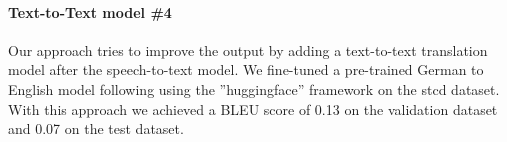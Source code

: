 \paragraph{Text-to-Text model \#4} Our  approach tries to improve the output by adding a text-to-text translation model after the speech-to-text model. We fine-tuned a pre-trained German to
English model following  using the ''huggingface'' framework \cite{wolf-etal-2020-transformers} on the \gls{stcd} dataset. With this approach we achieved a BLEU score of 0.13 on the validation dataset and
0.07 on the test dataset.
